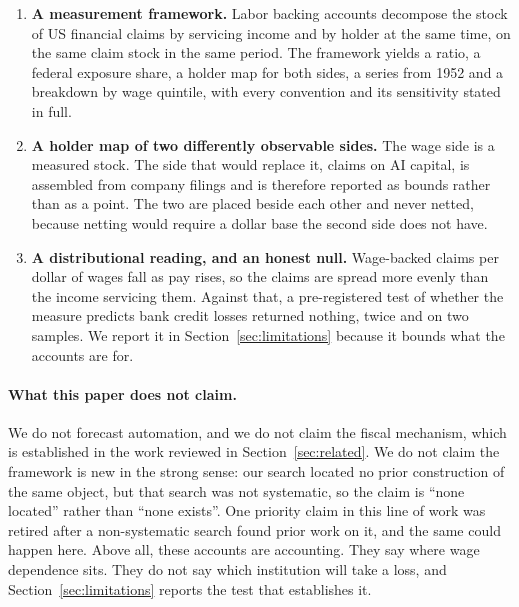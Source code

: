 \begin{enumerate}[leftmargin=1.6em]
  \item \textbf{A measurement framework.} Labor backing accounts decompose the stock of US
  financial claims by servicing income and by holder at the same time, on the same claim stock in
  the same period. The framework yields a ratio, a federal exposure share, a holder map for both
  sides, a series from 1952 and a breakdown by wage quintile, with every convention and its
  sensitivity stated in full.
  \item \textbf{A holder map of two differently observable sides.} The wage side is a measured
  stock. The side that would replace it, claims on AI capital, is assembled from company filings
  and is therefore reported as bounds rather than as a point. The two are placed beside each
  other and never netted, because netting would require a dollar base the second side does not
  have.
  \item \textbf{A distributional reading, and an honest null.} Wage-backed claims per dollar of
  wages fall as pay rises, so the claims are spread more evenly than the income servicing them.
  Against that, a pre-registered test of whether the measure predicts bank credit losses returned
  nothing, twice and on two samples. We report it in Section~\ref{sec:limitations} because it
  bounds what the accounts are for.
\end{enumerate}

\paragraph{What this paper does not claim.} We do not forecast automation, and we do not claim
the fiscal mechanism, which is established in the work reviewed in Section~\ref{sec:related}. We
do not claim the framework is new in the strong sense: our search located no prior construction
of the same object, but that search was not systematic, so the claim is ``none located'' rather
than ``none exists''. One priority claim in this line of work was retired after a non-systematic
search found prior work on it, and the same could happen here. Above all, these accounts are
accounting. They say where wage dependence sits. They do not say which institution will take a
loss, and Section~\ref{sec:limitations} reports the test that establishes it.

